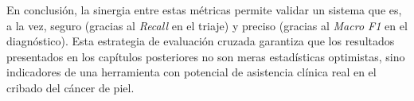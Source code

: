 En conclusión, la sinergia entre estas métricas permite validar un sistema que es, a la vez, seguro (gracias al \textit{Recall} en el triaje) y preciso (gracias al \textit{Macro F1} en el diagnóstico). Esta estrategia de evaluación cruzada garantiza que los resultados presentados en los capítulos posteriores no son meras estadísticas optimistas, sino indicadores de una herramienta con potencial de asistencia clínica real en el cribado del cáncer de piel.